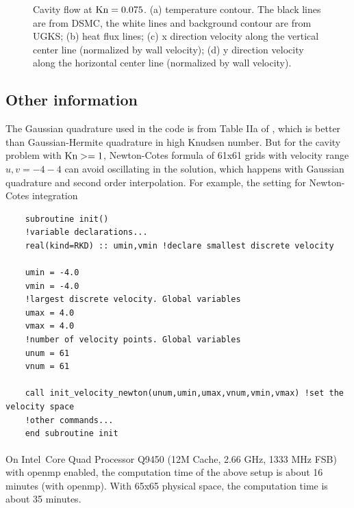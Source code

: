 \documentclass[a4paper]{book}
\begin{document}
\begin{figure}
{    }
    \caption{Cavity flow at ${\rm Kn}=0.075$. (a) temperature contour. The black lines are from DSMC, the white lines and background contour are from UGKS; (b) heat flux lines; (c) x direction velocity along the vertical center line (normalized by wall velocity); (d) y direction velocity along the horizontal center line (normalized by wall velocity).}
    \label{pic:cavity_solution}
\end{figure}

\subsection{Other information}
The Gaussian quadrature used in the code is from Table IIa of \cite{Shizgal1981}, which is better than Gaussian-Hermite quadrature in high Knudsen number. But for the cavity problem with ${\rm Kn}>=1$, Newton-Cotes formula of 61x61 grids with velocity range $u,v=-4-4$ can avoid oscillating in the solution, which happens with Gaussian quadrature and second order interpolation. For example, the setting for Newton-Cotes integration

\begin{verbatim}
    subroutine init()
    !variable declarations...
    real(kind=RKD) :: umin,vmin !declare smallest discrete velocity

    umin = -4.0
    vmin = -4.0
    !largest discrete velocity. Global variables
    umax = 4.0
    vmax = 4.0
    !number of velocity points. Global variables
    unum = 61
    vnum = 61

    call init_velocity_newton(unum,umin,umax,vnum,vmin,vmax) !set the velocity space
    !other commands...
    end subroutine init
\end{verbatim}

On Intel\textregistered\ Core\textsuperscript{\texttrademark} Quad Processor Q9450 (12M Cache, 2.66 GHz, 1333 MHz FSB) with openmp enabled, the computation time of the above setup is about 16 minutes (with openmp). With 65x65 physical space, the computation time is about 35 minutes.

\backmatter

\end{document}
